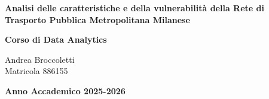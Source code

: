 \begin{titlepage}
	\begin{center}
            {\LARGE{
                    \textbf{Analisi delle caratteristiche e della vulnerabilità della Rete di Trasporto Pubblica Metropolitana Milanese}
                    \par}}
                            \vspace{15mm}
        {\large \textbf{Corso di Data Analytics}}


                            \vspace{30mm}
                    \large{Andrea Broccoletti} \\
            \large{Matricola 886155} 
        \end{center}
        



        
        \vspace{50mm}
        \begin{center}
            {\large{\bf Anno Accademico 2025-2026}}
        \end{center}

        \restoregeometry
        
    \end{titlepage}
\newpage